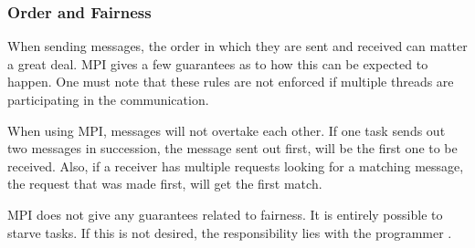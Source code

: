 \subsubsection{Order and Fairness}
When sending messages, the order in which they are sent and received can matter a great deal. MPI gives a few guarantees as to how this can be expected to happen. One must note that these rules are not enforced if multiple threads are participating in the communication.

When using MPI, messages will not overtake each other. If one task sends out two messages in succession, the message sent out first, will be the first one to be received. Also, if a receiver has multiple requests looking for a matching message, the request that was made first, will get the first match.

MPI does not give any guarantees related to fairness. It is entirely possible to starve tasks. If this is not desired, the responsibility lies with the programmer \cite{compLLNLMPI}.
